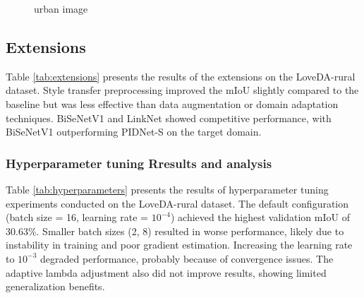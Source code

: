 \documentclass{article}
\begin{document}
\begin{multicols}{2}
\begin{figure}[H]
\begin{minipage}{0.8\linewidth}
			\end{minipage}


			\caption{urban image }
			\label{fig:transfer}

		\end{figure}



		\subsection{Extensions}
		\justifying
		Table \ref{tab:extensions} presents the results of the extensions on the LoveDA-rural dataset. Style transfer preprocessing improved the mIoU slightly compared to the baseline but was less effective than data augmentation or domain adaptation techniques. BiSeNetV1 and LinkNet showed competitive performance, with BiSeNetV1 outperforming PIDNet-S on the target domain.
		

		\begin{table}[H]
			\centering
			\renewcommand{\arraystretch}{1.2} %
			\setlength{\tabcolsep}{14pt} %
			
			\caption{Performance comparison of different models on rural images.}
			\label{tab:extensions}

		\end{table}


        \subsubsection{Hyperparameter tuning Rresults and analysis}
        \justifying
        Table \ref{tab:hyperparameters} presents the results of hyperparameter tuning experiments conducted on the LoveDA-rural dataset. The default configuration (batch size = 16, learning rate = \(10^{-4}\)) achieved the highest validation mIoU of 30.63\%. Smaller batch sizes (2, 8) resulted in worse performance, likely due to instability in training and poor gradient estimation. Increasing the learning rate to \(10^{-3}\) degraded performance, probably because of convergence issues. The adaptive lambda adjustment also did not improve results, showing limited generalization benefits.
        



\end{multicols}
\end{document}

